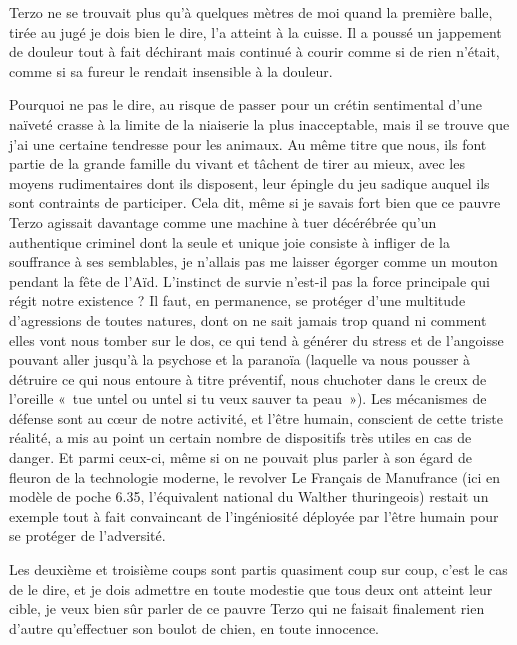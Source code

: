 Terzo ne se trouvait plus qu’à quelques mètres de moi quand la première balle, tirée au jugé je dois bien le dire, l’a atteint à la cuisse. Il a poussé un jappement de douleur tout à fait déchirant mais continué à courir comme si de rien n’était, comme si sa fureur le rendait insensible à la douleur.

Pourquoi ne pas le dire, au risque de passer pour un crétin sentimental d’une naïveté crasse à la limite de la niaiserie la plus inacceptable, mais il se trouve que j’ai une certaine tendresse pour les animaux. Au même titre que nous, ils font partie de la grande famille du vivant et tâchent de tirer au mieux, avec les moyens rudimentaires dont ils disposent, leur épingle du jeu sadique auquel ils sont contraints de participer. Cela dit, même si je savais fort bien que ce pauvre Terzo agissait davantage comme une machine à tuer décérébrée qu’un authentique criminel dont la seule et unique joie consiste à infliger de la souffrance à ses semblables, je n’allais pas me laisser égorger comme un mouton pendant la fête de l’Aïd. L’instinct de survie n’est-il pas la force principale qui régit notre existence ? Il faut, en permanence, se protéger d’une multitude d’agressions de toutes natures, dont on ne sait jamais trop quand ni comment elles vont nous tomber sur le dos, ce qui tend à générer du stress et de l’angoisse pouvant aller jusqu’à la psychose et la paranoïa (laquelle va nous pousser à détruire ce qui nous entoure à titre préventif, nous chuchoter dans le creux de l’oreille «~tue untel ou untel si tu veux sauver ta peau~»). Les mécanismes de défense sont au cœur de notre activité, et l’être humain, conscient de cette triste réalité, a mis au point un certain nombre de dispositifs très utiles en cas de danger. Et parmi ceux-ci, même si on ne pouvait plus parler à son égard de fleuron de la technologie moderne, le revolver Le Français de Manufrance (ici en modèle de poche 6.35, l’équivalent national du Walther thuringeois) restait un exemple tout à fait convaincant de l’ingéniosité déployée par l’être humain pour se protéger de l’adversité.

Les deuxième et troisième coups sont partis quasiment coup sur coup, c’est le cas de le dire, et je dois admettre en toute modestie que tous deux %
%
%
ont atteint leur cible, je veux bien sûr parler de ce pauvre Terzo qui ne faisait finalement rien d’autre qu’effectuer son boulot de chien, en toute innocence.

